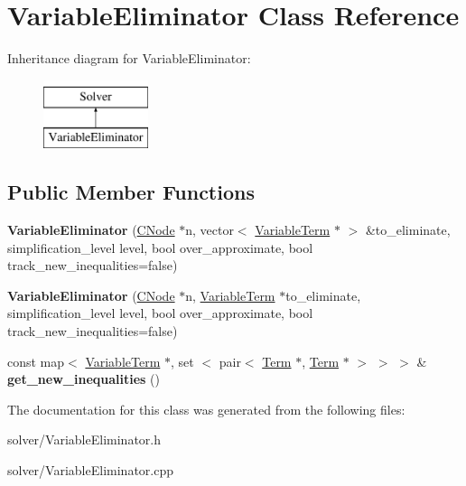 \hypertarget{classVariableEliminator}{\section{\-Variable\-Eliminator \-Class \-Reference}
\label{classVariableEliminator}
}
\-Inheritance diagram for \-Variable\-Eliminator\-:\begin{figure}[H]
\begin{center}
\leavevmode
\includegraphics[height=2.000000cm]{classVariableEliminator}
\end{center}
\end{figure}
\subsection*{\-Public \-Member \-Functions}
\begin{DoxyCompactItemize}
\item 
\hypertarget{classVariableEliminator_a6751413492bab4caaf0ceab3eb710098}{{\bfseries \-Variable\-Eliminator} (\hyperlink{classCNode}{\-C\-Node} $\ast$n, vector$<$ \hyperlink{classVariableTerm}{\-Variable\-Term} $\ast$ $>$ \&to\-\_\-eliminate, simplification\-\_\-level level, bool over\-\_\-approximate, bool track\-\_\-new\-\_\-inequalities=false)}\label{classVariableEliminator_a6751413492bab4caaf0ceab3eb710098}

\item 
\hypertarget{classVariableEliminator_ab6fc2ed942a6c00f9db6516e61e47ed5}{{\bfseries \-Variable\-Eliminator} (\hyperlink{classCNode}{\-C\-Node} $\ast$n, \hyperlink{classVariableTerm}{\-Variable\-Term} $\ast$to\-\_\-eliminate, simplification\-\_\-level level, bool over\-\_\-approximate, bool track\-\_\-new\-\_\-inequalities=false)}\label{classVariableEliminator_ab6fc2ed942a6c00f9db6516e61e47ed5}

\item 
\hypertarget{classVariableEliminator_aa27b290bccf655eea0c5c7eca6998232}{const map$<$ \hyperlink{classVariableTerm}{\-Variable\-Term} $\ast$, set\*
$<$ pair$<$ \hyperlink{classTerm}{\-Term} $\ast$, \hyperlink{classTerm}{\-Term} $\ast$ $>$ $>$ $>$ \& {\bfseries get\-\_\-new\-\_\-inequalities} ()}\label{classVariableEliminator_aa27b290bccf655eea0c5c7eca6998232}

\end{DoxyCompactItemize}


\-The documentation for this class was generated from the following files\-:\begin{DoxyCompactItemize}
\item 
solver/\-Variable\-Eliminator.\-h\item 
solver/\-Variable\-Eliminator.\-cpp\end{DoxyCompactItemize}
